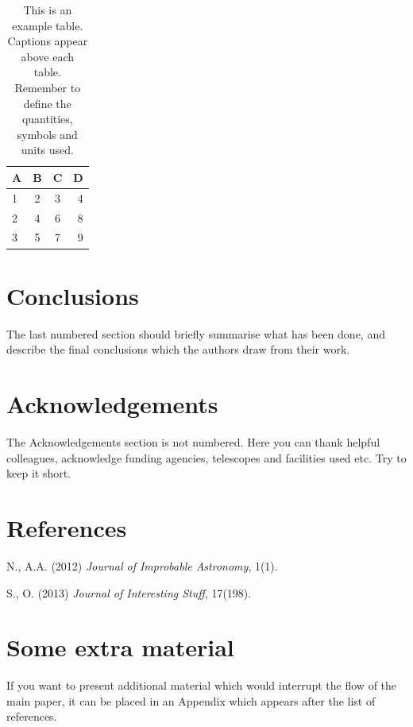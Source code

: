 \documentclass[a4paper,fleqn,usenatbib]{mnras}
\newlength{\cslhangindent}
\newlength{\cslentryspacingunit} %
\newenvironment{CSLReferences}[2] %
 {%
  \setlength{\parindent}{0pt}
  \ifodd #1
  \let\oldpar\par
  \def\par{\hangindent=\cslhangindent\oldpar}
  \fi
  \setlength{\parskip}{#2\cslentryspacingunit}
 }%
 {}
\begin{document}
\begin{table}
  \centering
  \caption{This is an example table. Captions appear above each table.
  Remember to define the quantities, symbols and units used.}
  \label{tab:example_table}
  \begin{tabular}{lccr} %
    \hline
    A & B & C & D\\
    \hline
    1 & 2 & 3 & 4\\
    2 & 4 & 6 & 8\\
    3 & 5 & 7 & 9\\
    \hline
  \end{tabular}
\end{table}

\hypertarget{conclusions}{%
\section{Conclusions}\label{conclusions}}

The last numbered section should briefly summarise what has been done,
and describe the final conclusions which the authors draw from their
work.

\hypertarget{acknowledgements}{%
\section*{Acknowledgements}\label{acknowledgements}}

The Acknowledgements section is not numbered. Here you can thank helpful
colleagues, acknowledge funding agencies, telescopes and facilities used
etc. Try to keep it short.

\hypertarget{references}{%
\section*{References}\label{references}}

\hypertarget{refs}{}
\begin{CSLReferences}{0}{0}
\leavevmode{}%
N., A.A. (2012) \emph{Journal of Improbable Astronomy}, 1(1).

\leavevmode{}%
S., O. (2013) \emph{Journal of Interesting Stuff}, 17(198).

\end{CSLReferences}

\appendix

\hypertarget{some-extra-material}{%
\section{Some extra material}\label{some-extra-material}}

If you want to present additional material which would interrupt the
flow of the main paper, it can be placed in an Appendix which appears
after the list of references.



\bsp	%
\label{lastpage}
\end{document}
